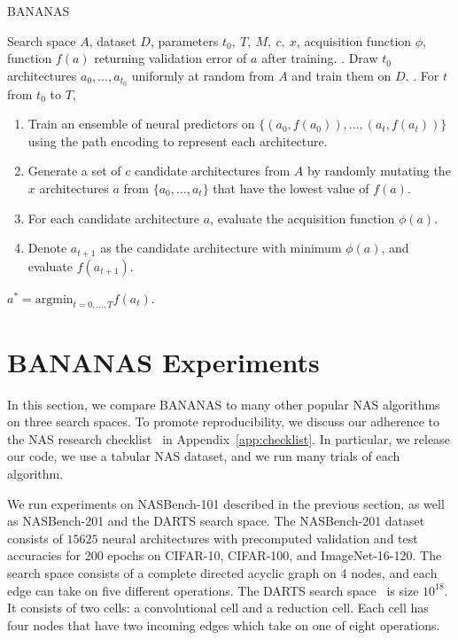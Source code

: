 \documentclass[11pt]{article}
\numberwithin{equation}{section}
\numberwithin{figure}{section}
\theoremstyle{plain}
\theoremstyle{definition}
\let\citep\cite
\begin{document}
\begin{algorithm}
\caption{BANANAS}\label{alg:bananas}
\begin{algorithmic}  Search space $A$, dataset $D$, parameters $t_0,~T,~M,~c,~x$, acquisition function $\phi$, function $f(a)$ returning validation error of $a$ after training.
. Draw $t_0$ architectures $a_0, \dots, a_{t_0}$ uniformly at random from $A$ and train them on $D$.
. For $t$ from $t_0$ to $T$,
\begin{enumerate}[label=\roman*., itemsep=1pt, parsep=1mm, topsep=1pt, leftmargin=8mm]
    \item 
Train an ensemble of neural predictors on $\{ (a_0, f(a_0)), \dots, (a_t, f(a_t)) \}$
using the path encoding to represent each architecture.
\item
Generate a set of $c$ candidate architectures from $A$ by
randomly mutating the $x$ architectures $a$ from $\{a_0, \dots, a_t\}$
that have the lowest value of $f(a)$.
\item 
For each candidate architecture $a$, evaluate the acquisition function $\phi(a)$.
\item
Denote $a_{t+1}$ as the candidate architecture with minimum $\phi(a)$, and evaluate $f(a_{t+1})$.
\end{enumerate}
 $a^*=\text{argmin}_{t=0,\ldots,T} f(a_t)$.
\end{algorithmic}
\end{algorithm}


 
\section{BANANAS Experiments}
\label{sec:experiments}




In this section, we compare BANANAS to many other popular NAS algorithms
on three search spaces.
To promote reproducibility, we discuss our adherence to the 
NAS research checklist~\cite{lindauer2019best} in 
Appendix~\ref{app:checklist}.
In particular, we release our code, we use
a tabular NAS dataset, and we run many trials of each algorithm.

We run experiments on NASBench-101 described in the previous section, 
as well as NASBench-201 and the DARTS search space.
The NASBench-201 dataset~\citep{yang2019evaluation} consists of
$15625$ neural architectures with precomputed validation and test
accuracies for 200 epochs on CIFAR-10, CIFAR-100, and ImageNet-16-120.
The search space consists of a complete directed acyclic graph on 4 nodes,
and each edge can take on five different operations.
The DARTS search space~\citep{darts} 
is size $10^{18}$. It consists of two cells: 
a convolutional cell and a reduction cell.
Each cell has four nodes that have two incoming edges which
take on one of eight operations. 
\end{document}
